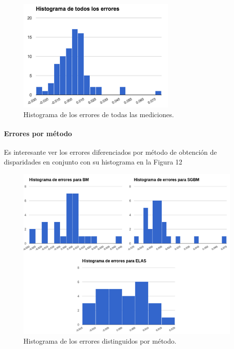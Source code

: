 \documentclass[11pt,a4paper,titlepage]{article}
\newcommand{\Figure}[1]{Figura #1}
\begin{document}
\begin{figure}[h!]

  \centering
    \includegraphics[width=0.7\textwidth]{f11.png}
  \caption{Histograma de los errores de todas las mediciones.}
\end{figure}

\paragraph{Errores por método}
\hfill \break
Es interesante ver los errores diferenciados por método de obtención de disparidades en conjunto con su histograma en la \Figure{12}


\begin{figure}[h!]

  \centering
    \includegraphics[width=1\textwidth]{f12.png}
  \caption{Histograma de los errores distinguidos por método.}
\end{figure}
\end{document}
